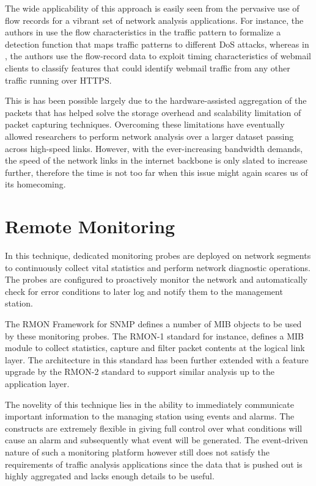 The wide applicability of this approach is easily seen from the pervasive use of flow records for a vibrant set of network analysis applications. For instance, the authors in \cite{mkim:2004} use the flow characteristics in the traffic pattern to formalize a detection function that maps traffic patterns to different \ac{DoS}  attacks, whereas in \cite{sdominik:2010}, the authors use the flow-record data to exploit timing characteristics of webmail clients to classify features that could identify webmail traffic from any other traffic running over HTTPS.

This is has been possible largely due to the hardware-assisted aggregation of the packets that has helped solve the storage overhead and scalability limitation of packet capturing techniques. Overcoming these limitations have eventually allowed researchers to perform network analysis over a  larger dataset passing across high-speed links. However, with the ever-increasing bandwidth demands, the speed of the network links in the internet backbone is only slated to increase further, therefore the time is not too far when this issue might again scares us of its homecoming. 

\section{Remote Monitoring}\label{sec:remote-monitoring}
In this technique, dedicated monitoring probes are deployed on network segments to continuously collect vital statistics and perform network diagnostic operations. The probes are configured to proactively monitor the network and automatically check for error conditions to later log and notify them to the management station. 

The \ac{RMON} Framework \cite{rfc3577} for \ac{SNMP} \cite{rfc1157} defines a number of \ac{MIB} objects to be used by these monitoring probes. The \ac{RMON}-1 standard \cite{rfc2819} for instance, defines a \ac{MIB}  module to collect statistics, capture and filter packet contents at the logical link layer. The architecture in this standard has been further extended with a feature upgrade by the \ac{RMON}-2 standard \cite{rfc4502} to support similar analysis up to the application layer.

The novelity of this technique lies in the ability to immediately communicate important information to the managing station using events and alarms. The constructs are extremely flexible in giving full control over what conditions will cause an alarm  and subsequently what event will be generated. The event-driven nature of such a monitoring platform however still does not satisfy the requirements of traffic analysis applications since the data that is pushed out is highly aggregated and lacks enough details to be useful. 

